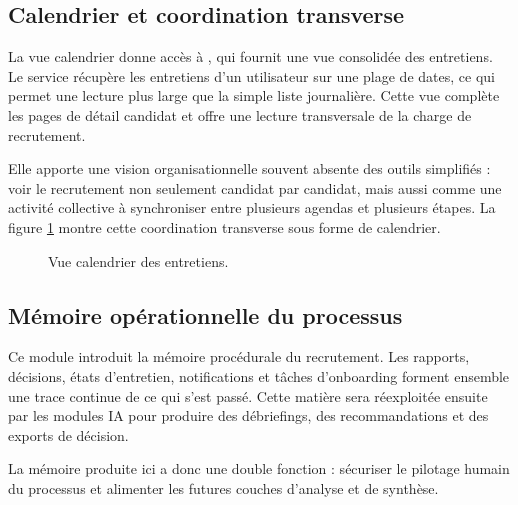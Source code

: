 \subsection{Calendrier et coordination transverse}
La vue calendrier donne accès à , qui fournit une vue consolidée des entretiens. Le service  récupère les entretiens d'un utilisateur sur une plage de dates, ce qui permet une lecture plus large que la simple liste journalière. Cette vue complète les pages de détail candidat et offre une lecture transversale de la charge de recrutement.

Elle apporte une vision organisationnelle souvent absente des outils simplifiés : voir le recrutement non seulement candidat par candidat, mais aussi comme une activité collective à synchroniser entre plusieurs agendas et plusieurs étapes.
La figure \ref{fig:calendar-view} montre cette coordination transverse sous forme de calendrier.

\begin{figure}[H]
  \centering
  \caption{\label{fig:calendar-view}Vue calendrier des entretiens.}
\end{figure}

\subsection{Mémoire opérationnelle du processus}
Ce module introduit la mémoire procédurale du recrutement. Les rapports, décisions, états d'entretien, notifications et tâches d'onboarding forment ensemble une trace continue de ce qui s'est passé. Cette matière sera réexploitée ensuite par les modules IA pour produire des débriefings, des recommandations et des exports de décision.

La mémoire produite ici a donc une double fonction : sécuriser le pilotage humain du processus et alimenter les futures couches d'analyse et de synthèse.

